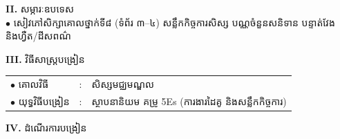 \documentclass[a4paper,10pt]{article}
\begin{document}
{\vspace{1pt}

\textbf{II.} {\muol សម្ភារៈឧបទេស}\\[1pt]
\hspace*{0.55cm}$\bullet$ \hspace{0.35cm} សៀវភៅសិក្សាគោលថ្នាក់ទី៨ (ទំព័រ ៣--៤) សន្លឹកកិច្ចការសិស្ស បណ្ណចំនួនសនិទាន បន្ទាត់វែង និងហ្វឺត/ដីសពណ៌

\vspace{1pt}

\textbf{III.} {\muol វិធីសាស្រ្តបង្រៀន}\\[1pt]
\hspace*{0.55cm}%
\begin{tabular}{@{}l l l@{}}
  $\bullet$ \hspace{0.35cm} គោលវិធី & : \hspace{0.7cm} & សិស្សមជ្ឈមណ្ឌល \\
  $\bullet$ \hspace{0.35cm} យុទ្ធវិធីបង្រៀន & : & ស្ថាបនានិយម គម្រូ 5Es (ការងារដៃគូ និងសន្លឹកកិច្ចការ) \\
\end{tabular}
}

\vspace{1pt}

\textbf{IV.} {\muol ដំណើរការបង្រៀន}

\vspace{1pt}
\end{document}
